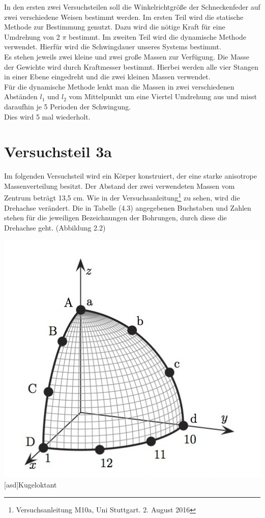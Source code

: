 \documentclass[12pt,a4paper,]{scrreprt}
\begin{document}
	
		In den ersten zwei Versuchsteilen soll die Winkelrichtgröße der Schneckenfeder auf zwei verschiedene Weisen bestimmt werden. Im ersten Teil wird die statische Methode zur Bestimmung genutzt. Dazu wird die nötige Kraft für eine Umdrehung von 2 $\pi$ bestimmt. Im zweiten Teil wird die dynamische Methode verwendet.  Hierfür wird die Schwingdauer unseres Systems bestimmt.\\
		Es stehen jeweils zwei kleine und zwei große Massen zur Verfügung. Die Masse der Gewichte wird durch Kraftmesser bestimmt. 
		Hierbei werden alle vier Stangen in einer Ebene eingedreht und die zwei kleinen Massen verwendet.\\
		Für die dynamische Methode lenkt man die Massen in zwei verschiedenen Abständen $l_1$ und $l_2$ vom Mittelpunkt um eine Viertel Umdrehung aus und misst daraufhin je 5 Perioden der Schwingung.\\
		Dies wird 5 mal wiederholt. \\

		\section{Versuchsteil 3a}
			Im folgenden Versuchsteil wird ein Körper konstruiert, der eine starke anisotrope Massenverteilung besitzt. Der Abstand der zwei verwendeten Massen vom Zentrum beträgt 13,5 cm. Wie in der Versuchsanleitung\footnote{Versuchsanleitung M10a, Uni Stuttgart. 2. August 2016} zu sehen, wird die Drehachse verändert. Die in Tabelle (4.3) angegebenen Buchstaben und Zahlen stehen für die jeweiligen Bezeichnungen der Bohrungen, durch diese die Drehachse geht. (Abbildung 2.2)\\
            
  \begin{center}
  \includegraphics[scale=0.4]{1_M10.jpg}
  [asd]{Kugeloktant\protect\footnotemark}
  \end{center}
\end{document}
